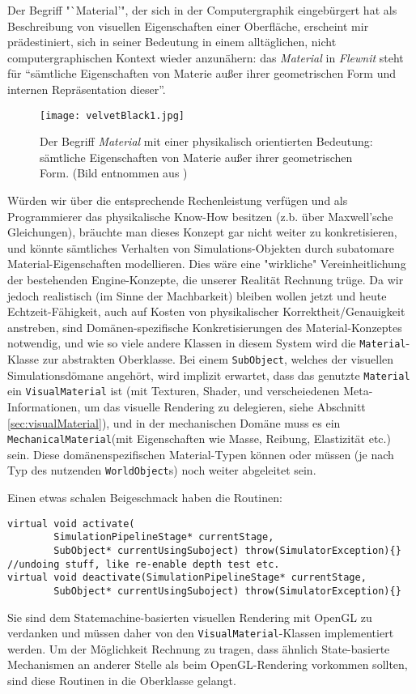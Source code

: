 	Der Begriff "`Material'", der sich in der Computergraphik eingebürgert hat als Beschreibung von visuellen Eigenschaften
	einer Oberfläche, erscheint mir prädestiniert, sich in seiner Bedeutung in einem alltäglichen,
	nicht computergraphischen Kontext wieder anzunähern:
	das \emph{Material} in \emph{Flewnit} steht für "`sämtliche Eigenschaften von Materie 
	außer ihrer geometrischen Form und internen Repräsentation dieser"'.

	\begin{figure}[!h]
		\centering
	   	\texttt{[image: velvetBlack1.jpg]}
		\caption{ Der Begriff \emph{Material} mit einer physikalisch orientierten Bedeutung:
			sämtliche Eigenschaften von Materie	außer ihrer geometrischen Form.
			(Bild entnommen aus \cite{microfacet})
		}
		\label{fig:material}
	\end{figure}
	
	Würden wir über die entsprechende Rechenleistung verfügen und als Programmierer das physikalische Know-How
	besitzen (z.b. über Maxwell'sche Gleichungen), bräuchte man dieses Konzept gar nicht weiter zu konkretisieren,
	und könnte sämtliches Verhalten von Simulations-Objekten durch subatomare Material-Eigenschaften modellieren.
	Dies wäre eine "wirkliche" Vereinheitlichung der bestehenden Engine-Konzepte, die unserer Realität Rechnung trüge.
	Da wir jedoch realistisch (im Sinne der Machbarkeit) bleiben wollen jetzt und heute Echtzeit-Fähigkeit,
	auch auf Kosten von physikalischer Korrektheit/Genauigkeit anstreben, sind Domänen-spezifische Konkretisierungen des
	Material-Konzeptes notwendig, und wie so viele andere Klassen in diesem System wird die 
	\lstinline|Material|-Klasse zur abstrakten Oberklasse.
	Bei einem \lstinline|SubObject|, welches der visuellen Simulationsdömane angehört, wird implizit erwartet,
	dass das genutzte \lstinline|Material| ein \lstinline|VisualMaterial| ist 
	(mit Texturen, Shader, und verscheiedenen Meta-Informationen, um das visuelle Rendering zu delegieren,
	siehe Abschnitt \ref{sec:visualMaterial}), 
	und in der mechanischen Domäne muss es ein \lstinline|MechanicalMaterial|(mit Eigenschaften wie Masse, Reibung, 	
	Elastizität etc.) sein. Diese domänenspezifischen Material-Typen können oder müssen (je nach Typ des nutzenden
	\lstinline|WorldObject|s) noch weiter abgeleitet sein.
	
	Einen etwas schalen Beigeschmack haben die Routinen:
	\begin{lstlisting}
virtual void activate(
		SimulationPipelineStage* currentStage,
		SubObject* currentUsingSuboject) throw(SimulatorException){}
//undoing stuff, like re-enable depth test etc.
virtual void deactivate(SimulationPipelineStage* currentStage,
		SubObject* currentUsingSuboject) throw(SimulatorException){}
	\end{lstlisting}
	Sie sind dem Statemachine-basierten visuellen Rendering mit OpenGL zu verdanken und müssen daher von den
	\lstinline|VisualMaterial|-Klassen implementiert werden. Um der Möglichkeit Rechnung zu tragen, dass
	ähnlich State-basierte Mechanismen an anderer Stelle als beim OpenGL-Rendering vorkommen sollten, sind diese
	Routinen in die Oberklasse gelangt.

